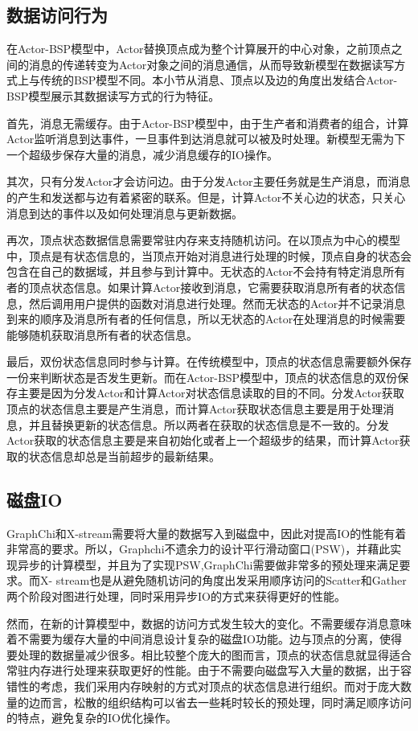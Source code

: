 \subsection{数据访问行为}
在Actor-BSP模型中，Actor替换顶点成为整个计算展开的中心对象，之前顶点之间的消息的传递转变为Actor对象之间的消息通信，从而导致新模型在数据读写方式上与传统的BSP模型不同。本小节从消息、顶点以及边的角度出发结合Actor-BSP模型展示其数据读写方式的行为特征。

首先，消息无需缓存。由于Actor-BSP模型中，由于生产者和消费者的组合，计算Actor监听消息到达事件，一旦事件到达消息就可以被及时处理。新模型无需为下一个超级步保存大量的消息，减少消息缓存的IO操作。

其次，只有分发Actor才会访问边。由于分发Actor主要任务就是生产消息，而消息的产生和发送都与边有着紧密的联系。但是，计算Actor不关心边的状态，只关心消息到达的事件以及如何处理消息与更新数据。

再次，顶点状态数据信息需要常驻内存来支持随机访问。在以顶点为中心的模型中，顶点是有状态信息的，当顶点开始对消息进行处理的时候，顶点自身的状态会包含在自己的数据域，并且参与到计算中。无状态的Actor不会持有特定消息所有者的顶点状态信息。如果计算Actor接收到消息，它需要获取消息所有者的状态信息，然后调用用户提供的函数对消息进行处理。然而无状态的Actor并不记录消息到来的顺序及消息所有者的任何信息，所以无状态的Actor在处理消息的时候需要能够随机获取消息所有者的状态信息。

最后，双份状态信息同时参与计算。在传统模型中，顶点的状态信息需要额外保存一份来判断状态是否发生更新。而在Actor-BSP模型中，顶点的状态信息的双份保存主要是因为分发Actor和计算Actor对状态信息读取的目的不同。分发Actor获取顶点的状态信息主要是产生消息，而计算Actor获取状态信息主要是用于处理消息，并且替换更新的状态信息。所以两者在获取的状态信息是不一致的。分发Actor获取的状态信息主要是来自初始化或者上一个超级步的结果，而计算Actor获取的状态信息却总是当前超步的最新结果。



\subsection{磁盘IO}
GraphChi和X-stream需要将大量的数据写入到磁盘中，因此对提高IO的性能有着非常高的要求。所以，Graphchi不遗余力的设计平行滑动窗口(PSW)，并藉此实现异步的计算模型，并且为了实现PSW,GraphChi需要做非常多的预处理来满足要求。而X- stream也是从避免随机访问的角度出发采用顺序访问的Scatter和Gather两个阶段对图进行处理，同时采用异步IO的方式来获得更好的性能。

然而，在新的计算模型中，数据的访问方式发生较大的变化。不需要缓存消息意味着不需要为缓存大量的中间消息设计复杂的磁盘IO功能。边与顶点的分离，使得要处理的数据量减少很多。相比较整个庞大的图而言，顶点的状态信息就显得适合常驻内存进行处理来获取更好的性能。由于不需要向磁盘写入大量的数据，出于容错性的考虑，我们采用内存映射的方式对顶点的状态信息进行组织。而对于庞大数量的边而言，松散的组织结构可以省去一些耗时较长的预处理，同时满足顺序访问的特点，避免复杂的IO优化操作。

